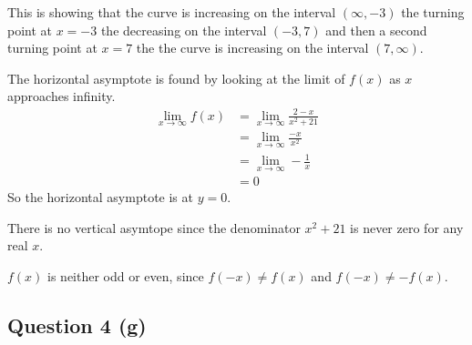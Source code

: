 \documentclass{tufte-handout}
\begin{document}
\begin{question}
This is showing that the curve is increasing on the interval \( (\infty,-3) \) the turning point at \( x = -3 \) the decreasing
on the interval \( (-3,7) \) and then a second turning point at \( x=7 \) the the curve is increasing on the 
interval \( (7,\infty) \).

\vspace{3cm}

\qpart

The horizontal asymptote is found by looking at the limit of \( f(x) \) as \( x \) approaches infinity.
\begin{align*}
    \lim_{x \to \infty} f(x) &= \lim_{x \to \infty} \frac{2 - x}{x^{2} + 21}\\
    &= \lim_{x \to \infty} \frac{-x}{x^{2}}\\
    &= \lim_{x \to \infty} -\frac{1}{x}\\
    &= 0
\end{align*}
So the horizontal asymptote is at \( y = 0 \).

There is no vertical asymtope since the denominator \( x^{2} + 21 \) is never zero for any real \( x \).

\vspace{3cm}

\qpart

\( f(x) \) is neither odd or even, since \( f(-x) \neq f(x) \) and \( f(-x) \neq -f(x) \).

\vspace{3cm}

\qpart
\subsection*{Question 4 (g)}


\end{question}

\clearpage
\end{document}
